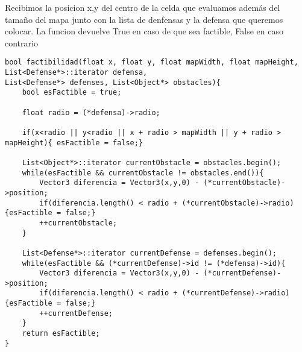
Recibimos la posicion x,y del centro de la celda que evaluamos además del tamaño del mapa junto con la lista de denfensas y la defensa que queremos colocar.
La funcion devuelve True en caso de que sea factible, False en caso contrario

\begin{lstlisting}
bool factibilidad(float x, float y, float mapWidth, float mapHeight, List<Defense*>::iterator defensa,
List<Defense*> defenses, List<Object*> obstacles){
	bool esFactible = true;
	
	float radio = (*defensa)->radio;

	if(x<radio || y<radio || x + radio > mapWidth || y + radio > mapHeight){ esFactible = false;}

	List<Object*>::iterator currentObstacle = obstacles.begin();
	while(esFactible && currentObstacle != obstacles.end()){
		Vector3 diferencia = Vector3(x,y,0) - (*currentObstacle)->position;
		if(diferencia.length() < radio + (*currentObstacle)->radio) {esFactible = false;}
		++currentObstacle;
	}

	List<Defense*>::iterator currentDefense = defenses.begin();
	while(esFactible && (*currentDefense)->id != (*defensa)->id){
		Vector3 diferencia = Vector3(x,y,0) - (*currentDefense)->position;
		if(diferencia.length() < radio + (*currentDefense)->radio) {esFactible = false;}
		++currentDefense;
	}
	return esFactible;
}
\end{lstlisting}

\vspace{5mm}

